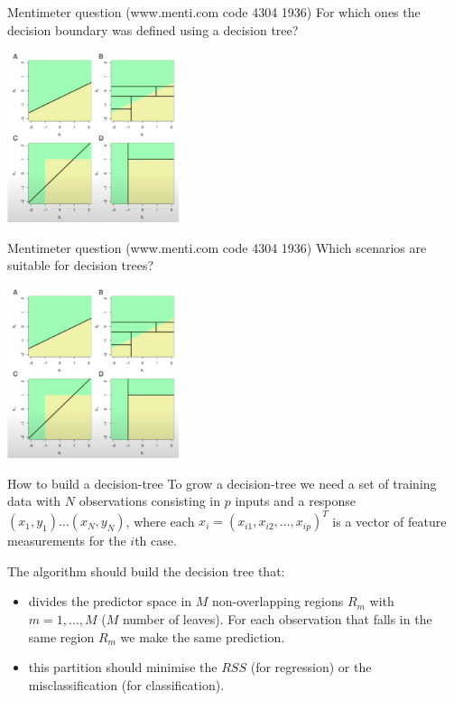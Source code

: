 \documentclass[notes]{beamer}          %
\begin{document}
\begin{frame}{Mentimeter question (www.menti.com code 4304 1936)}
For which ones the decision boundary was defined using a decision tree?
\begin{center}
\includegraphics[height=5cm]{../figures/week_2_classification/Question_decision_tree}  
\end{center}
\end{frame}

\begin{frame}{Mentimeter question (www.menti.com code 4304 1936)}
Which scenarios are suitable for decision trees?
\begin{center}
\includegraphics[height=5cm]{../figures/week_2_classification/Question_decision_tree}  
\end{center}
\end{frame}



\begin{frame}{How to build a decision-tree}
To grow a decision-tree we need a set of training data with $N$ observations consisting in $p$ inputs and a response
$(x_1,y_1) \dots (x_N,y_N)$, where each $x_i=(x_{i1}, x_{i2}, \dots, x_{ip})^T$ is a vector of feature measurements for the $i$th case.

\vspace{0.5cm}

The algorithm should build the decision tree that:

\begin{itemize}
\item divides the predictor space in $M$ non-overlapping regions $R_m$ with $m=1,...,M$ ($M$ number of leaves). For each observation that falls in the same region $R_m$ we make the same prediction.
\item this partition should minimise the $RSS$ (for regression) or the misclassification (for classification).
\end{itemize}
\end{frame}
\end{document}

